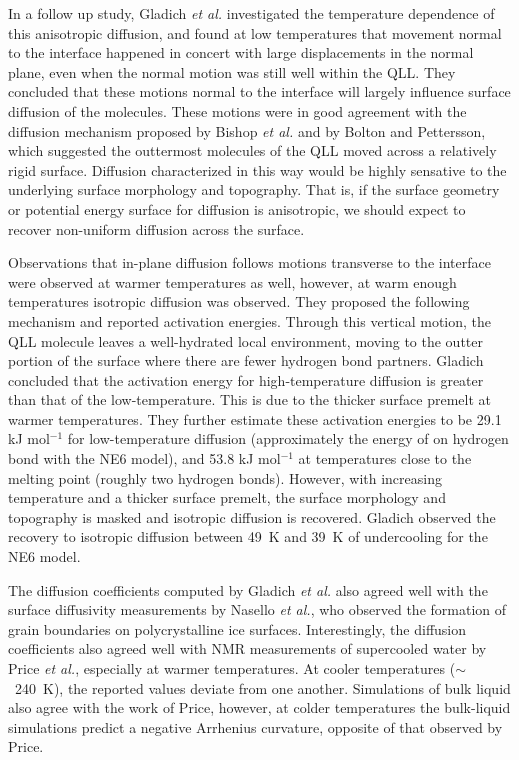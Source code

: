 In a follow up study, Gladich \textit{et al.} investigated the
temperature dependence of this anisotropic diffusion, and found at low
temperatures that movement normal to the interface happened in concert
with large displacements in the normal plane, even when the normal
motion was still well within the QLL.\cite{Gladich2011} They concluded
that these motions normal to the interface will largely influence
surface diffusion of the molecules. These motions were in good
agreement with the diffusion mechanism proposed by Bishop \textit{et
  al.}\cite{Bishop2009} and by Bolton and Pettersson\cite{Bolton2000},
which suggested the outtermost molecules of the QLL moved across a
relatively rigid surface. Diffusion characterized in this way would be
highly sensative to the underlying surface morphology and topography.
That is, if the surface geometry or potential energy surface for
diffusion is anisotropic, we should expect to recover non-uniform
diffusion across the surface.

Observations that in-plane diffusion follows motions transverse to the
interface were observed at warmer temperatures as well, however, at
warm enough temperatures isotropic diffusion was
observed.\cite{Gladich2011,Gladich2015} They proposed the following
mechanism and reported activation energies. Through this vertical
motion, the QLL molecule leaves a well-hydrated local environment,
moving to the outter portion of the surface where there are fewer
hydrogen bond partners. Gladich concluded that the activation energy
for high-temperature diffusion is greater than that of the
low-temperature. This is due to the thicker surface premelt at warmer
temperatures.  They further estimate these activation energies to be
29.1 kJ mol$^{-1}$ for low-temperature diffusion (approximately the
energy of on hydrogen bond with the NE6 model), and 53.8 kJ mol$^{-1}$
at temperatures close to the melting point (roughly two hydrogen
bonds).  However, with increasing temperature and a thicker surface
premelt, the surface morphology and topography is masked and isotropic
diffusion is recovered. Gladich observed the recovery to isotropic
diffusion between 49~K and 39~K of undercooling for the NE6 model.

The diffusion coefficients computed by Gladich \textit{et al.} also
agreed well with the surface diffusivity measurements by Nasello
\textit{et al.}, who observed the formation of grain boundaries on
polycrystalline ice surfaces.\cite{Nasello2007} Interestingly, the
diffusion coefficients also agreed well with NMR measurements of
supercooled water by Price \textit{et al.}, especially at warmer
temperatures. \cite{Price1999} At cooler temperatures ($\sim$~240~K),
the reported values deviate from one another. Simulations of bulk
liquid also agree with the work of Price, however, at colder
temperatures the bulk-liquid simulations predict a negative Arrhenius
curvature, opposite of that observed by
Price.\cite{Picaud2006,Mahoney2001}


